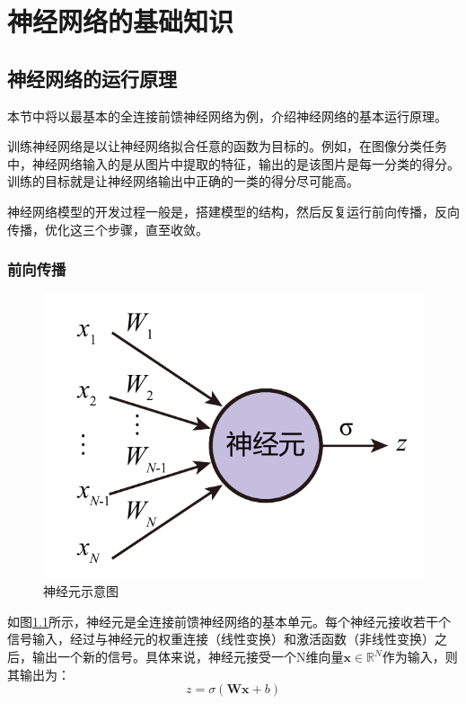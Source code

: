 \chapter{神经网络的基础知识}

\section{神经网络的运行原理} \label{nn-principal}

本节中将以最基本的全连接前馈神经网络为例，介绍神经网络的基本运行原理。

训练神经网络是以让神经网络拟合任意的函数为目标的。例如，在图像分类任务中，神经网络输入的是从图片中提取的特征，输出的是该图片是每一分类的得分。训练的目标就是让神经网络输出中正确的一类的得分尽可能高。

神经网络模型的开发过程一般是，搭建模型的结构，然后反复运行前向传播，反向传播，优化这三个步骤，直至收敛。

\subsection{前向传播} \label{nn-forward}

\begin{figure}[]
    \centering
    \includegraphics[page=1]{figure/figures.pdf}
    \caption{神经元示意图}
    \label{nunit}
\end{figure}

如图\ref{nunit}所示，神经元是全连接前馈神经网络的基本单元。每个神经元接收若干个信号输入，经过与神经元的权重连接（线性变换）和激活函数（非线性变换）之后，输出一个新的信号。具体来说，神经元接受一个N维向量$\bm{x}\in\mathbb{R}^N$作为输入，则其输出为：
\begin{equation}
    z=\sigma\left(\bm{W}\bm{x}+b\right)
\end{equation}

